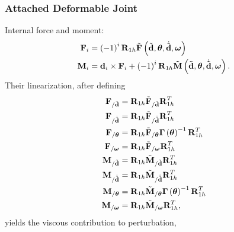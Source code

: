\documentclass[10pt,dvips,fleqn,subeqn]{report}
\newcommand{\T}[1]{\bm{\mathbf{#1}}}
\begin{document}
\subsubsection{Attached Deformable Joint}
Internal force and moment:
\begin{subequations}
\begin{align}
	\T{F}_i &= \plbr{ -1 }^i \T{R}_{1h} \tilde{\T{F}}\plbr{\tilde{\T{d}}, \T{\theta}, \dot{\tilde{\T{d}}}, \T{\omega}} \\
	\T{M}_i &= \T{d}_i \times \T{F}_i
	+ \plbr{-1}^i \T{R}_{1h} \tilde{\T{M}}\plbr{\tilde{\T{d}}, \T{\theta}, \dot{\tilde{\T{d}}}, \T{\omega}} .
\end{align}
\end{subequations}
Their linearization, after defining
\begin{subequations}
\begin{align}
	\T{F}_{/\tilde{\T{d}}} &=
		\T{R}_{1h} \tilde{\T{F}}_{/\tilde{\T{d}}} \T{R}_{1h}^T \\
	\T{F}_{/\dot{\tilde{\T{d}}}} &=
		\T{R}_{1h} \tilde{\T{F}}_{/\dot{\tilde{\T{d}}}} \T{R}_{1h}^T \\
	\T{F}_{/\T{\theta}}
		&= \T{R}_{1h} \tilde{\T{F}}_{/\T{\theta}} \T{\Gamma}\plbr{\T{\theta}}^{-1} \T{R}_{1h}^T \\
	\T{F}_{/\T{\omega}}
		&= \T{R}_{1h} \tilde{\T{F}}_{/\T{\omega}} \T{R}_{1h}^T \\
	\T{M}_{/\tilde{\T{d}}} &=
		\T{R}_{1h} \tilde{\T{M}}_{/\tilde{\T{d}}} \T{R}_{1h}^T \\
	\T{M}_{/\dot{\tilde{\T{d}}}} &=
		\T{R}_{1h} \tilde{\T{M}}_{/\dot{\tilde{\T{d}}}} \T{R}_{1h}^T \\
	\T{M}_{/\T{\theta}}
		&= \T{R}_{1h} \tilde{\T{M}}_{/\T{\theta}} \T{\Gamma}\plbr{\T{\theta}}^{-1} \T{R}_{1h}^T \\
	\T{M}_{/\T{\omega}}
		&= \T{R}_{1h} \tilde{\T{M}}_{/\T{\omega}} \T{R}_{1h}^T ,
\end{align}
\end{subequations}
yields the viscous contribution to perturbation,
\end{document}
